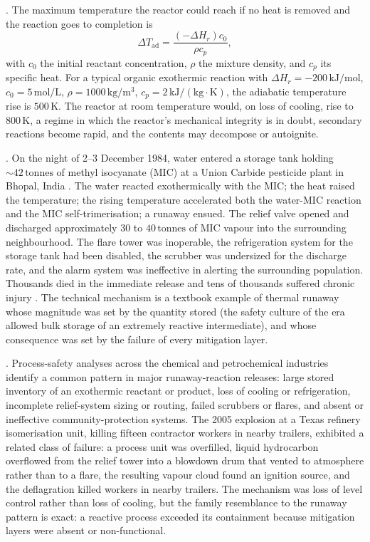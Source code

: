 . The maximum temperature the
reactor could reach if no heat is removed and the reaction goes to
completion is
\[
\Delta T_{\text{ad}} = \frac{(-\Delta H_r) c_0}{\rho c_p},
\]
with $c_0$ the initial reactant concentration, $\rho$ the mixture
density, and $c_p$ its specific heat. For a typical organic exothermic
reaction with $\Delta H_r = -200\,\text{kJ}/\text{mol}$, $c_0 = 5\,
\text{mol}/\text{L}$, $\rho = 1000\,\text{kg}/\text{m}^3$, $c_p =
2\,\text{kJ}/(\text{kg}\cdot\si{\kelvin})$, the adiabatic temperature
rise is $500\,\si{\kelvin}$. The reactor at room temperature would,
on loss of cooling, rise to $800\,\si{\kelvin}$, a regime in which
the reactor's mechanical integrity is in doubt, secondary reactions
become rapid, and the contents may decompose or autoignite.

. On the night of 2--3 December 1984,
water entered a storage tank holding $\sim 42\,\text{tonnes}$ of
methyl isocyanate (MIC) at a Union Carbide pesticide plant in Bhopal,
India \cite{acc:icmr-bhopal-2004}. The water reacted exothermically
with the MIC; the heat raised the temperature; the rising temperature
accelerated both the water-MIC reaction and the MIC self-trimerisation;
a runaway ensued. The relief valve opened and discharged approximately
$30$ to $40\,\text{tonnes}$ of MIC vapour into the surrounding
neighbourhood. The flare tower was inoperable, the refrigeration
system for the storage tank had been disabled, the scrubber was
undersized for the discharge rate, and the alarm system was
ineffective in alerting the surrounding population. Thousands died in
the immediate release and tens of thousands suffered chronic injury
\cite{acc:icmr-bhopal-2004}. The technical mechanism is a
textbook example of thermal runaway whose magnitude was set by the
quantity stored (the safety culture of the era allowed bulk storage
of an extremely reactive intermediate), and whose consequence was set
by the failure of every mitigation layer.

. Process-safety analyses across
the chemical and petrochemical industries identify a common pattern
in major runaway-reaction releases: large stored inventory of an
exothermic reactant or product, loss of cooling or refrigeration,
incomplete relief-system sizing or routing, failed scrubbers or
flares, and absent or ineffective community-protection systems. The
2005 explosion at a Texas refinery isomerisation unit, killing fifteen
contractor workers in nearby trailers, exhibited a related class of
failure: a process unit was overfilled, liquid hydrocarbon overflowed
from the relief tower into a blowdown drum that vented to atmosphere
rather than to a flare, the resulting vapour cloud found an ignition
source, and the deflagration killed workers in nearby trailers. The
mechanism was loss of level control rather than loss of cooling, but
the family resemblance to the runaway pattern is exact: a reactive
process exceeded its containment because mitigation layers were
absent or non-functional.

